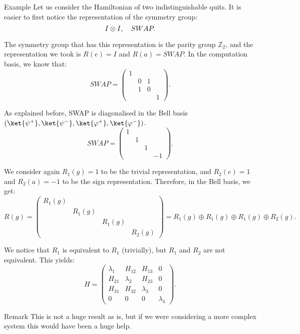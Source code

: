 \documentclass[a4paper]{article}
\begin{document}
\begin{parag}{Example}
    Let us consider the Hamiltonian of two indistinguishable quits. It is easier to first notice the representation of the symmetry group: 
    \[I \otimes I, \quad SWAP.\]

    The symmetry group that has this representation is the parity group $\mathbb{Z}_2$, and the representation we took is $R\left(e\right) = I$ and $R\left(a\right) = SWAP$. In the computation basis, we know that: 
    \[SWAP = \begin{pmatrix} 1 &  &  &  \\  & 0 & 1 &  \\  & 1 & 0 &  \\  &  &  & 1 \end{pmatrix}.\]

    As explained before, SWAP is diagonalised in the Bell basis $\left(\ket{\psi^+}, \ket{\psi^-}, \ket{\phi^+}, \ket{\phi^-}\right)$.
    \[SWAP = \begin{pmatrix} 1 &  &  &  \\  & 1 &  &  \\  &  & 1 &  \\  &  &  & -1 \end{pmatrix}.\]

    We consider again $R_1\left(g\right) = 1$ to be the trivial representation, and $R_2\left(e\right) = 1$ and $R_2\left(a\right) = -1$ to be the sign representation. Therefore, in the Bell basis, we get: 
    \[R\left(g\right) = \begin{pmatrix} R_1\left(g\right) &  &  &  \\  & R_1\left(g\right) &  &  \\  &  & R_1\left(g\right) &  \\  &  &  & R_2\left(g\right) \end{pmatrix} = R_1\left(g\right) \oplus R_1\left(g\right) \oplus R_1\left(g\right) \oplus R_2\left(g\right).\]
    
    We notice that $R_1$ is equivalent to $R_1$ (trivially), but $R_1$ and $R_2$ are not equivalent. This yields: 
    \[H = \begin{pmatrix} \lambda_1 & H_{12} & H_{13} & 0 \\ H_{21} & \lambda_2 & H_{23} & 0 \\ H_{31} & H_{32} & \lambda_3 & 0 \\ 0 & 0 & 0 & \lambda_4 \end{pmatrix}.\]

    \begin{subparag}{Remark}
        This is not a huge result as is, but if we were considering a more complex system this would have been a huge help. 
    \end{subparag}
\end{parag}
\end{document}

